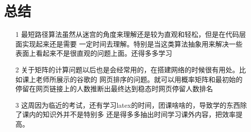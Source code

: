 \section{总结}
\begin{itemize}
    \item [1]最短路径算法虽然从迷宫的角度来理解还是较为直观和轻松，但是在代码层面实现起来还是需要
    一定时间去理解。特别是当这类算法抽象用来解决一些表面上看起来不是很直观的问题上面。还得多多学习
    \item [2]关于矩阵的计算问题以后也是会经常用的，在搭建网络的时候很有用处。比如课上老师所展示的谷歌的
    网页排序的问题。就可以用概率矩阵和最初始的停留在网页链接上的人数推断出最终达到稳态时网页停留人数排名
    \item [3]这周因为临近的考试，还有学习latex的时间，团课啥啥的，导致学的东西除了课内的知识外并不是特别多
    还是得多多抽出时间学习课外内容，把效率提高。
\end{itemize}